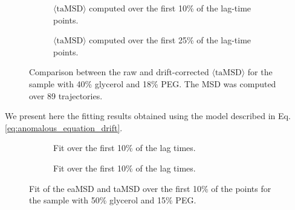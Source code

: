 \begin{figure}[!htbp]
    \centering
    \begin{subfigure}[t]{0.48\textwidth}
        \centering
        
        \caption{$\langle \mathrm{taMSD} \rangle$ computed over the first 10\% of the lag-time points.}
    \end{subfigure}
    \hfill
    \begin{subfigure}[t]{0.48\textwidth}
        \centering
        
        \caption{$\langle \mathrm{taMSD} \rangle$ computed over the first 25\% of the lag-time points.}
    \end{subfigure}

    \caption{Comparison between the raw and drift-corrected $\langle \mathrm{taMSD} \rangle$ for the sample with 40\% glycerol and 18\% PEG. The MSD was computed over 89 trajectories.}
    \label{fig:tamsd_drift_cmp_glic200_series2}
\end{figure}
\FloatBarrier

We present here the fitting results obtained using the model described in Eq. \ref{eq:anomalous_equation_drift}.

\begin{figure}[!htbp]
    \centering
    \begin{subfigure}[t]{0.48\textwidth}
        \centering
        
        \caption{Fit over the first 10\% of the lag times.}
    \end{subfigure}
    \hfill
    \begin{subfigure}[t]{0.48\textwidth}
        \centering
        
        \caption{Fit over the first 10\% of the lag times.}
    \end{subfigure}

    \caption{Fit of the eaMSD and taMSD over the first 10\% of the points for the sample with 50\% glycerol and 15\% PEG.}
    \label{fig:anomalous_fit_taMSD_eaMSD_PEG_18_plots}
\end{figure}
\FloatBarrier

